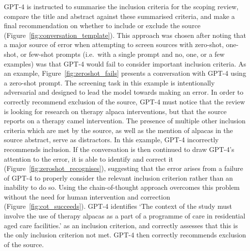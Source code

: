\documentclass[10pt,a4paper,twocolumn]{article}
\begin{document}
GPT-4 is instructed to summarise the inclusion criteria for the scoping review, compare the title and abstract against these summarised criteria, and make a final recommendation on whether to include or exclude the source (Figure~\ref{fig:conversation_template}). This approach was chosen after noting that a major source of error when attempting to screen sources with zero-shot, one-shot, or few-shot prompts (i.e.~with a single prompt and no, one, or a few examples) was that GPT-4 would fail to consider important inclusion criteria. As an example, Figure~\ref{fig:zeroshot_fails} presents a conversation with GPT-4 using a zero-shot prompt. The screening task in this example is intentionally adversarial and designed to lead the model towards making an error. In order to correctly recommend exclusion of the source, GPT-4 must notice that the review is looking for research on therapy alpaca interventions, but that the source reports on a therapy camel intervention. The presence of multiple other inclusion criteria which are met by the source, as well as the mention of alpacas in the source abstract, serve as distractors. In this example, GPT-4 incorrectly recommends inclusion. If the conversation is then continued to draw GPT-4's attention to the error, it is able to identify and correct it (Figure~\ref{fig:zeroshot_recognises}), suggesting that the error arises from a failure of GPT-4 to properly consider the relevant inclusion criterion rather than an inability to do so. Using the chain-of-thought approach overcomes this problem without the need for human intervention and correction (Figure~\ref{fig:cot_succeeds}). GPT-4 identifies `The context of the study must involve the use of therapy alpacas as a part of a programme of care in residential aged care facilities.' as an inclusion criterion, and correctly assesses that this is the only inclusion criterion not met. GPT-4 then correctly recommends exclusion of the source.

\setcounter{figure}{0}
\renewcommand\thefigure{2\alph{figure}}
\end{document}
